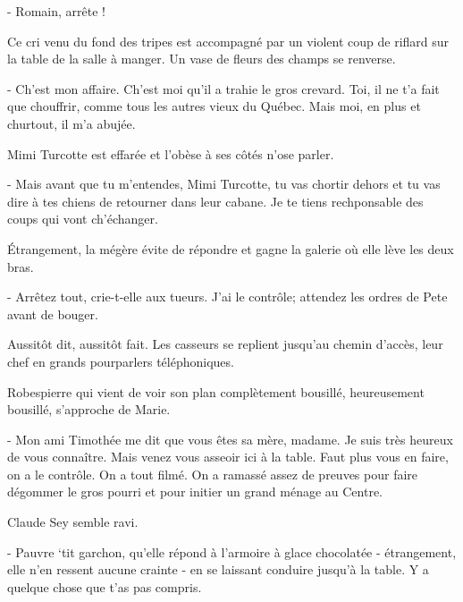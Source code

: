 - Romain, arrête !

Ce cri venu du fond des tripes est accompagné par un violent coup de riflard sur la table de la salle à manger. Un vase de fleurs des champs se renverse.

- Ch’est mon affaire. Ch’est moi qu’il a trahie le gros crevard. Toi, il ne t’a fait que chouffrir, comme tous les autres vieux du Québec. Mais moi, en plus et churtout, il m’a abujée.

Mimi Turcotte est effarée et l’obèse à ses côtés n’ose parler.

- Mais avant que tu m’entendes, Mimi Turcotte, tu vas chortir dehors et tu vas dire à tes chiens de retourner dans leur cabane. Je te tiens rechponsable des coups qui vont ch’échanger.

Étrangement, la mégère évite de répondre et gagne la galerie où elle lève les deux bras.

- Arrêtez tout, crie-t-elle aux tueurs. J’ai le contrôle; attendez les ordres de Pete avant de bouger.

Aussitôt dit, aussitôt fait. Les casseurs se replient jusqu’au chemin d’accès, leur chef en grands pourparlers téléphoniques.

Robespierre qui vient de voir son plan complètement bousillé, heureusement bousillé, s’approche de Marie.

- Mon ami Timothée me dit que vous êtes sa mère, madame. Je suis très heureux de vous connaître. Mais venez vous asseoir ici à la table. Faut plus vous en faire, on a le contrôle. On a tout filmé. On a ramassé assez de preuves pour faire dégommer le gros pourri et pour initier un grand ménage au Centre.

Claude Sey semble ravi.

- Pauvre ‘tit garchon, qu’elle répond à l’armoire à glace chocolatée - étrangement, elle n’en ressent aucune crainte - en se laissant conduire jusqu’à la table. Y a quelque chose que t’as pas compris.


